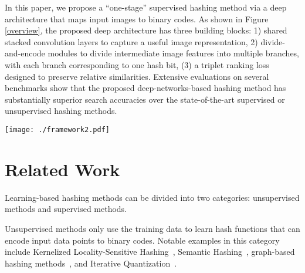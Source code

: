 \documentclass[10pt,twocolumn,letterpaper]{article}
\begin{document}
In this paper, we propose a ``one-stage'' supervised hashing method
via a deep architecture that maps input images to binary
codes. As shown in Figure \ref{overview}, the proposed deep
architecture has three building blocks:
 1) shared stacked
convolution layers to capture a useful image representation, 2)
divide-and-encode modules to divide intermediate image features
into multiple branches, with each branch corresponding to one hash
bit, (3) a triplet ranking loss~\cite{triplet} designed to preserve
relative similarities.
Extensive evaluations on several benchmarks
show that the proposed deep-networks-based hashing method has
substantially superior search accuracies over the state-of-the-art
supervised or unsupervised hashing methods.
\begin{figure*}\label{overview}
  \centering
  \texttt{[image: ./framework2.pdf]}
  \caption{Overview of the proposed deep architecture for hashing. The input to the proposed architecture is in the form of triplets, i.e., $(I,I^+,I^-)$ with a query image $I$ being more similar to an image $I^+$ than to another image $I^-$. Through the proposed architecture, the image triplets are first encoded into a triplet of image feature vectors by a shared stack of multiple convolution layers. Then, each image feature vector in the triplet is converted to a hash code by a divide-and-encode module. After that, these hash codes are used in a triplet ranking loss that aims to preserve relative similarities on images.}
\end{figure*}

\section{Related Work}
Learning-based hashing methods can be divided into two categories: unsupervised methods and supervised methods.

Unsupervised methods only use the training data to learn hash functions that can encode input data points to binary codes. Notable examples in this category include Kernelized Locality-Sensitive Hashing~\cite{KLSH}, Semantic Hashing~\cite{Semantic}, graph-based hashing methods~\cite{SH,AGH}, and Iterative Quantization~\cite{ITQ}.
\end{document}
